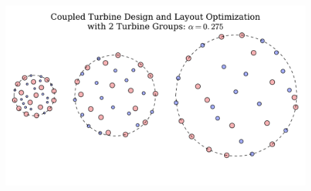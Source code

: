 \begin{figure}[htbp]
  \centering
  \includegraphics[width=\textwidth]{Figures/CircleLayoutALL2_0_275.pdf}
  \caption{\label{circ275A2}}
\end{figure}
